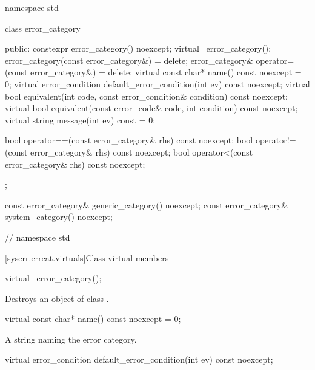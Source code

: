 %
%
%
\begin{codeblock}
namespace std {
  class error_category {
  public:
    constexpr error_category() noexcept;
    virtual ~error_category();
    error_category(const error_category&) = delete;
    error_category& operator=(const error_category&) = delete;
    virtual const char* name() const noexcept = 0;
    virtual error_condition default_error_condition(int ev) const noexcept;
    virtual bool equivalent(int code, const error_condition& condition) const noexcept;
    virtual bool equivalent(const error_code& code, int condition) const noexcept;
    virtual string message(int ev) const = 0;
    
    bool operator==(const error_category& rhs) const noexcept;
    bool operator!=(const error_category& rhs) const noexcept;
    bool operator<(const error_category& rhs) const noexcept;
  };

  const error_category& generic_category() noexcept;
  const error_category& system_category() noexcept;

}   // namespace std
\end{codeblock}

[syserr.errcat.virtuals]{Class  virtual members}

%
\begin{itemdecl}
virtual ~error_category();
\end{itemdecl}

\begin{itemdescr}
\pnum
\effects Destroys an object of class .
\end{itemdescr}

%
\begin{itemdecl}
virtual const char* name() const noexcept = 0;
\end{itemdecl}

\begin{itemdescr}
\pnum
\returns A string naming the error category.
\end{itemdescr}

%
\begin{itemdecl}
virtual error_condition default_error_condition(int ev) const noexcept;
\end{itemdecl}

